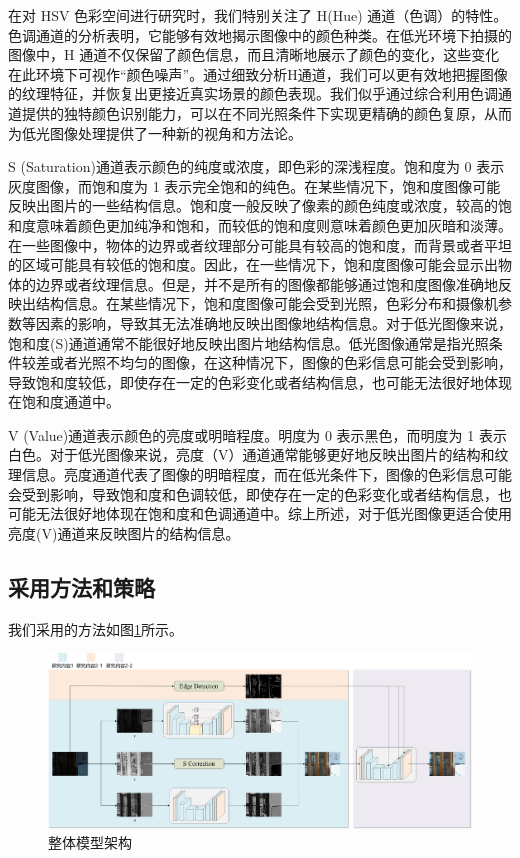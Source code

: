 \documentclass[a4paper]{ctexart}
\begin{document}
	
	在对 HSV 色彩空间进行研究时，我们特别关注了 H(Hue) 通道（色调）的特性。色调通道的分析表明，它能够有效地揭示图像中的颜色种类。在低光环境下拍摄的图像中，H 通道不仅保留了颜色信息，而且清晰地展示了颜色的变化，这些变化在此环境下可视作“颜色噪声”。通过细致分析H通道，我们可以更有效地把握图像的纹理特征，并恢复出更接近真实场景的颜色表现。我们似乎通过综合利用色调通道提供的独特颜色识别能力，可以在不同光照条件下实现更精确的颜色复原，从而为低光图像处理提供了一种新的视角和方法论。
	
	S (Saturation)通道表示颜色的纯度或浓度，即色彩的深浅程度。饱和度为 0 表示灰度图像，而饱和度为 1 表示完全饱和的纯色。在某些情况下，饱和度图像可能反映出图片的一些结构信息。饱和度一般反映了像素的颜色纯度或浓度，较高的饱和度意味着颜色更加纯净和饱和，而较低的饱和度则意味着颜色更加灰暗和淡薄。在一些图像中，物体的边界或者纹理部分可能具有较高的饱和度，而背景或者平坦的区域可能具有较低的饱和度。因此，在一些情况下，饱和度图像可能会显示出物体的边界或者纹理信息。但是，并不是所有的图像都能够通过饱和度图像准确地反映出结构信息。在某些情况下，饱和度图像可能会受到光照，色彩分布和摄像机参数等因素的影响，导致其无法准确地反映出图像地结构信息。对于低光图像来说，饱和度(S)通道通常不能很好地反映出图片地结构信息。低光图像通常是指光照条件较差或者光照不均匀的图像，在这种情况下，图像的色彩信息可能会受到影响，导致饱和度较低，即使存在一定的色彩变化或者结构信息，也可能无法很好地体现在饱和度通道中。
	
	V (Value)通道表示颜色的亮度或明暗程度。明度为 0 表示黑色，而明度为 1 表示白色。对于低光图像来说，亮度（V）通道通常能够更好地反映出图片的结构和纹理信息。亮度通道代表了图像的明暗程度，而在低光条件下，图像的色彩信息可能会受到影响，导致饱和度和色调较低，即使存在一定的色彩变化或者结构信息，也可能无法很好地体现在饱和度和色调通道中。综上所述，对于低光图像更适合使用亮度(V)通道来反映图片的结构信息。
	
	\subsection*{采用方法和策略}
	
	我们采用的方法如图\ref{fig: HSV Architecture}所示。
	
	\begin{figure}[htbp]
		\centering
		\includegraphics[width=0.7\linewidth]{picture/LLIE/My Architecture/HSV Architecture}
		\caption{整体模型架构}
		\label{fig: HSV Architecture}	
	\end{figure}
	
\end{document}

